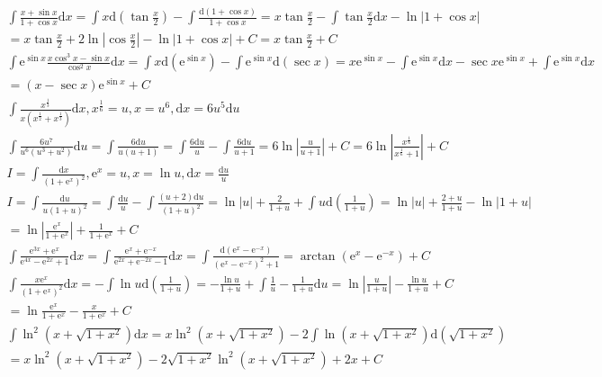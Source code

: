 \documentclass{article}
\begin{document}
\begin{align*}
    \int \frac{x+\sin x}{1+\cos x} \mathrm{d}x = \int x\mathrm{d}(\tan \frac{x}{2}) - \int \frac{\mathrm{d}(1+\cos x)}{1+\cos x} = x\tan \frac{x}{2} - \int \tan \frac{x}{2}\mathrm{d}x - \ln|1+\cos x| \\
    = x\tan \frac{x}{2} + 2\ln|\cos \frac{x}{2}| - \ln|1+\cos x| + C = x \tan \frac{x}{2} + C \\
    \int \mathrm{e}^{\sin x} \frac{x\cos^3 x - \sin x}{\cos^2 x} \mathrm{d}x = \int x \mathrm{d}(\mathrm{e}^{\sin x}) - \int \mathrm{e}^{\sin x} \mathrm{d}(\sec x) = x\mathrm{e}^{\sin x} -\int \mathrm{e}^{\sin x} \mathrm{d}x -\sec x\mathrm{e}^{\sin x} + \int \mathrm{e}^{\sin x}\mathrm{d}x \\
    = (x-\sec x )\mathrm{e}^{\sin x} + C \\ 
    \int \frac{x^{\frac{1}{3}}}{x(x^{\frac{1}{2}}+x^{\frac{1}{3}})}\mathrm{d}x , x^{\frac{1}{6}} = u ,x = u^6 ,\mathrm{d}x = 6u^5\mathrm{d}u \\
    \int \frac{6u^7}{u^6(u^3+u^2)} \mathrm{d}u = \int \frac{6\mathrm{d}u}{u(u+1)} = \int \frac{6\mathrm{d}u}{u} - \int \frac{6\mathrm{d}u}{u+1} = 6\ln\left|\frac{u}{u+1}\right| + C = 6\ln \left|\frac{x^{\frac{1}{6}}}{x^{\frac{1}{6}}+1}\right| + C \\
    I = \int \frac{\mathrm{d}x}{(1+\mathrm{e}^{x})^2} , \mathrm{e}^{x} = u , x=\ln u,\mathrm{d}x = \frac{\mathrm{d}u}{u} \\
    I = \int \frac{\mathrm{d}u}{u(1+u)^2} = \int \frac{\mathrm{d}u}{u} - \int \frac{(u+2)\mathrm{d}u}{(1+u)^2} = \ln|u| + \frac{2}{1+u} + \int u \mathrm{d}\left(\frac{1}{1+u}\right) = \ln|u| + \frac{2+u}{1+u} - \ln|1+u| \\ 
    = \ln\left|\frac{\mathrm{e}^{x}}{1+\mathrm{e}^{x}}\right| + \frac{1}{1+\mathrm{e}^{x}} + C\\
    \int \frac{\mathrm{e}^{3x}+\mathrm{e}^{x}}{\mathrm{e}^{4x}-\mathrm{e}^{2x}+1}\mathrm{d}x = \int \frac{\mathrm{e}^{x}+\mathrm{e}^{-x}}{\mathrm{e}^{2x}+\mathrm{e}^{-2x}-1}\mathrm{d}x = \int \frac{\mathrm{d}(\mathrm{e}^{x}-\mathrm{e}^{-x})}{(\mathrm{e}^{x}-\mathrm{e}^{-x})^2+1} = \arctan (\mathrm{e}^{x}-\mathrm{e}^{-x}) + C \\
    \int \frac{x\mathrm{e}^{x}}{(1+\mathrm{e}^{x})^2}\mathrm{d}x = - \int \ln u \mathrm{d}\left(\frac{1}{1+u}\right) = - \frac{\ln u}{1+u} + \int \frac{1}{u} - \frac{1}{1+u}\mathrm{d}u = \ln \left|\frac{u}{1+u}\right| - \frac{\ln u}{1+u} + C \\ 
    = \ln \frac{\mathrm{e}^{x}}{1+\mathrm{e}^{x}} - \frac{x}{1+\mathrm{e}^{x}} + C \\
    \int \ln^2 (x+\sqrt{1+x^2}) \mathrm{d}x = x\ln^2 (x+\sqrt{1+x^2}) - 2 \int \ln (x+\sqrt{1+x^2}) \mathrm{d}(\sqrt{1+x^2}) \\
    = x\ln^2 (x+\sqrt{1+x^2}) -2\sqrt{1+x^2} \ln^2 (x+\sqrt{1+x^2}) + 2x + C \\
\end{align*}    
\end{document}
